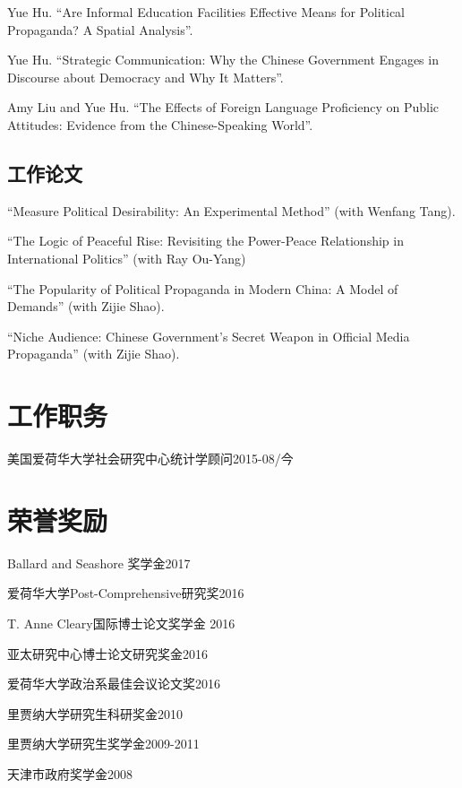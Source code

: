 \documentclass[10.5pt,]{article}
\providecommand{\tightlist}{%
	\setlength{\itemsep}{0pt}\setlength{\parskip}{0pt}}
\renewenvironment{itemize}{
	\begin{list}{}{
			\setlength{\leftmargin}{1.5em}
		}
	}{
	\end{list}
}
\begin{document}
Yue Hu. ``Are Informal Education Facilities Effective Means for
Political Propaganda? A Spatial Analysis''.

Yue Hu. ``Strategic Communication: Why the Chinese Government Engages in
Discourse about Democracy and Why It Matters''.

Amy Liu and Yue Hu. ``The Effects of Foreign Language Proficiency on
Public Attitudes: Evidence from the Chinese-Speaking World''.

\subsection{工作论文}

``Measure Political Desirability: An Experimental Method'' (with Wenfang
Tang).

``The Logic of Peaceful Rise: Revisiting the Power-Peace Relationship in
International Politics'' (with Ray Ou-Yang)

``The Popularity of Political Propaganda in Modern China: A Model of
Demands'' (with Zijie Shao).

``Niche Audience: Chinese Government's Secret Weapon in Official Media
Propaganda'' (with Zijie Shao).

\section{工作职务}

\begin{itemize}
\tightlist
\item
  美国爱荷华大学社会研究中心统计学顾问\hfill 2015-08/今
\end{itemize}

\section{荣誉奖励}

\begin{itemize}
\tightlist
\item
  Ballard and Seashore 奖学金\hfill 2017
\item
  爱荷华大学Post-Comprehensive研究奖\hfill 2016
\item
  T. Anne Cleary国际博士论文奖学金 \hfill 2016
\item
  亚太研究中心博士论文研究奖金\hfill 2016
\item
  爱荷华大学政治系最佳会议论文奖\hfill 2016
\item
  里贾纳大学研究生科研奖金\hfill 2010
\item
  里贾纳大学研究生奖学金\hfill 2009-2011
\item
  天津市政府奖学金\hfill 2008
\end{itemize}
\end{document}
